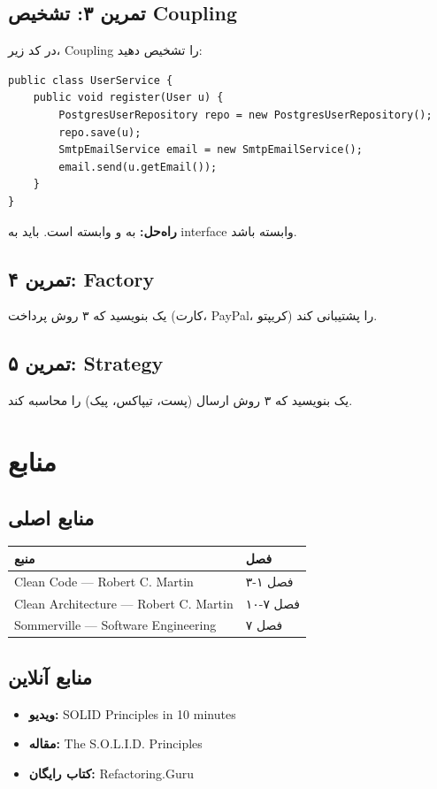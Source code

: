 \documentclass[12pt, a4paper]{article}
\begin{document}
\subsection{تمرین ۳: تشخیص Coupling}
در کد زیر، Coupling را تشخیص دهید:
\begin{lstlisting}
public class UserService {
    public void register(User u) {
        PostgresUserRepository repo = new PostgresUserRepository();
        repo.save(u);
        SmtpEmailService email = new SmtpEmailService();
        email.send(u.getEmail());
    }
}
\end{lstlisting}
\textbf{راه‌حل:}  به  و 
 وابسته است. باید به interface وابسته باشد.

\subsection{تمرین ۴: Factory}
یک  بنویسید که ۳ روش پرداخت (کارت، PayPal، کریپتو) را 
پشتیبانی کند.

\subsection{تمرین ۵: Strategy}
یک  بنویسید که ۳ روش ارسال (پست، تیپاکس، پیک) را 
محاسبه کند.

\section{منابع}

\subsection{منابع اصلی}
\begin{center}
\begin{tabular}{|l|l|}
\hline
\textbf{منبع} & \textbf{فصل} \\
\hline
Clean Code — Robert C. Martin & فصل ۱-۳ \\
\hline
Clean Architecture — Robert C. Martin & فصل ۷-۱۰ \\
\hline
Sommerville — Software Engineering & فصل ۷ \\
\hline
\end{tabular}
\end{center}

\subsection{منابع آنلاین}
\begin{itemize}
    \item \textbf{ویدیو:} SOLID Principles in 10 minutes
    \item \textbf{مقاله:} The S.O.L.I.D. Principles
    \item \textbf{کتاب رایگان:} Refactoring.Guru
\end{itemize}
\end{document}
